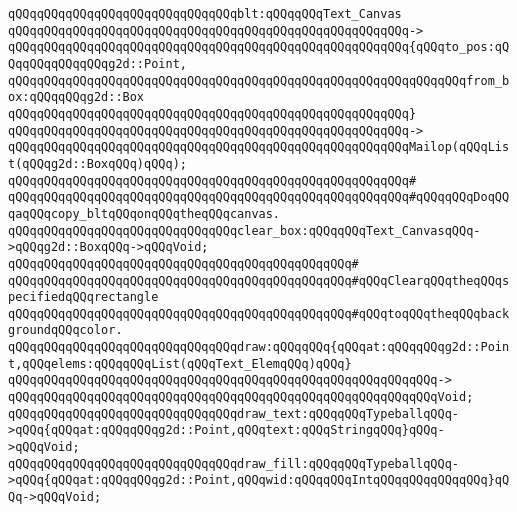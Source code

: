 \verb|qQQqqQQqqQQqqQQqqQQqqQQqqQQqqQQqblt:qQQqqQQqText_Canvas|\newline
\verb|qQQqqQQqqQQqqQQqqQQqqQQqqQQqqQQqqQQqqQQqqQQqqQQqqQQqqQQq->|\newline
\verb|qQQqqQQqqQQqqQQqqQQqqQQqqQQqqQQqqQQqqQQqqQQqqQQqqQQqqQQq{qQQqto_pos:qQQqqQQqqQQqqQQqg2d::Point,|\newline
\verb|qQQqqQQqqQQqqQQqqQQqqQQqqQQqqQQqqQQqqQQqqQQqqQQqqQQqqQQqqQQqqQQqfrom_box:qQQqqQQqg2d::Box|\newline
\verb|qQQqqQQqqQQqqQQqqQQqqQQqqQQqqQQqqQQqqQQqqQQqqQQqqQQqqQQq}|\newline
\verb|qQQqqQQqqQQqqQQqqQQqqQQqqQQqqQQqqQQqqQQqqQQqqQQqqQQqqQQq->|\newline
\verb|qQQqqQQqqQQqqQQqqQQqqQQqqQQqqQQqqQQqqQQqqQQqqQQqqQQqqQQqMailop(qQQqList(qQQqg2d::BoxqQQq)qQQq);|\newline
\verb|qQQqqQQqqQQqqQQqqQQqqQQqqQQqqQQqqQQqqQQqqQQqqQQqqQQqqQQq#|\newline
\verb|qQQqqQQqqQQqqQQqqQQqqQQqqQQqqQQqqQQqqQQqqQQqqQQqqQQqqQQq#qQQqqQQqDoqQQqaqQQqcopy_bltqQQqonqQQqtheqQQqcanvas.|\newline
\newline
\verb|qQQqqQQqqQQqqQQqqQQqqQQqqQQqqQQqclear_box:qQQqqQQqText_CanvasqQQq->qQQqg2d::BoxqQQq->qQQqVoid;|\newline
\verb|qQQqqQQqqQQqqQQqqQQqqQQqqQQqqQQqqQQqqQQqqQQqqQQq#|\newline
\verb|qQQqqQQqqQQqqQQqqQQqqQQqqQQqqQQqqQQqqQQqqQQqqQQq#qQQqClearqQQqtheqQQqspecifiedqQQqrectangle|\newline
\verb|qQQqqQQqqQQqqQQqqQQqqQQqqQQqqQQqqQQqqQQqqQQqqQQq#qQQqtoqQQqtheqQQqbackgroundqQQqcolor.|\newline
\newline
\verb|qQQqqQQqqQQqqQQqqQQqqQQqqQQqqQQqdraw:qQQqqQQq{qQQqat:qQQqqQQqg2d::Point,qQQqelems:qQQqqQQqList(qQQqText_ElemqQQq)qQQq}|\newline
\verb|qQQqqQQqqQQqqQQqqQQqqQQqqQQqqQQqqQQqqQQqqQQqqQQqqQQqqQQqqQQq->|\newline
\verb|qQQqqQQqqQQqqQQqqQQqqQQqqQQqqQQqqQQqqQQqqQQqqQQqqQQqqQQqqQQqVoid;|\newline
\newline
\verb|qQQqqQQqqQQqqQQqqQQqqQQqqQQqqQQqdraw_text:qQQqqQQqTypeballqQQq->qQQq{qQQqat:qQQqqQQqg2d::Point,qQQqtext:qQQqStringqQQq}qQQq->qQQqVoid;|\newline
\verb|qQQqqQQqqQQqqQQqqQQqqQQqqQQqqQQqdraw_fill:qQQqqQQqTypeballqQQq->qQQq{qQQqat:qQQqqQQqg2d::Point,qQQqwid:qQQqqQQqIntqQQqqQQqqQQqqQQq}qQQq->qQQqVoid;|\newline
